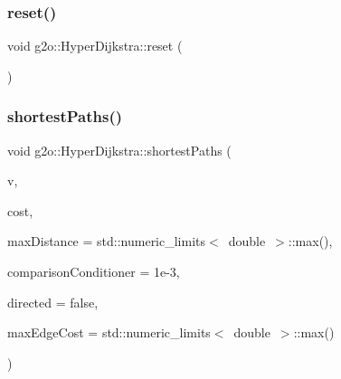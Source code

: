 \mbox{\label{structg2o_1_1_hyper_dijkstra_ad9c39fd01a0740f2beff98c927aaebbd}} 
\subsubsection{\texorpdfstring{reset()}{reset()}}
{\footnotesize\ttfamily void g2o\+::\+Hyper\+Dijkstra\+::reset (\begin{DoxyParamCaption}{ }\end{DoxyParamCaption})\hspace{0.3cm}{\ttfamily [protected]}}

\mbox{\label{structg2o_1_1_hyper_dijkstra_ad88b79c73c8eaa5f1afbe27b778b542e}} 
\subsubsection{\texorpdfstring{shortest\+Paths()}{shortestPaths()}\hspace{0.1cm}{\footnotesize\ttfamily [1/2]}}
{\footnotesize\ttfamily void g2o\+::\+Hyper\+Dijkstra\+::shortest\+Paths (\begin{DoxyParamCaption}\item[{\mbox{\hyperlink{classg2o_1_1_hyper_graph_1_1_vertex}{Hyper\+Graph\+::\+Vertex}} $\ast$}]{v,  }\item[{\mbox{\hyperlink{structg2o_1_1_hyper_dijkstra_1_1_cost_function}{Hyper\+Dijkstra\+::\+Cost\+Function}} $\ast$}]{cost,  }\item[{double}]{max\+Distance = {\ttfamily std\+:\+:numeric\+\_\+limits$<$~double~$>$\+:\+:max()},  }\item[{double}]{comparison\+Conditioner = {\ttfamily 1e-\/3},  }\item[{bool}]{directed = {\ttfamily false},  }\item[{double}]{max\+Edge\+Cost = {\ttfamily std\+:\+:numeric\+\_\+limits$<$~double~$>$\+:\+:max()} }\end{DoxyParamCaption})}

\mbox{\label{structg2o_1_1_hyper_dijkstra_a00d978615ff1bbb9917351e9cba0b4ba}} 
